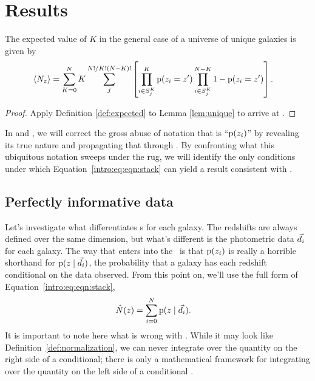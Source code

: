 \section{Results}

\begin{theorem}\label{thm:general}
	The expected value of $K$ in the general case of a universe of unique galaxies is given by
	\begin{align}
	\eqlabel{eqn:complete}
	\langle N_{z} \rangle &= \sum_{K = 0}^{N} K \sum_{j}^{N! / K! (N - K)!} \left[ \prod_{i \in S^{K}_{j}}^{K} \pr{z_{i} = z'} \prod_{i \in S^{K}_{j}}^{N - K} 1 - \pr{z_{i} = z'} \right].
	\end{align}
\end{theorem}
\begin{proof}
	Apply Definition \ref{def:expected} to Lemma \ref{lem:unique} to arrive at .
\end{proof}

In  and , we will correct the gross abuse of notation that is ``$\mathrm{p}(z_{i})$'' by revealing its true nature and propagating that through .
By confronting what this ubiquitous notation sweeps under the rug, we will identify the only conditions under which Equation~\ref{intro:eq:eqn:stack} can yield a result consistent with .

\subsection{Perfectly informative data}

Let's investigate what differentiates \pzpdf s for each galaxy.
The redshifts are always defined over the same dimension, but what's different is the photometric data $\vec{d}_{i}$ for each galaxy.
The way that enters into the \pzpdf\ is that $\mathrm{p}(z_{i})$ is really a horrible shorthand for $\mathrm{p}(z \mid \vec{d}_{i})$, the probability that a galaxy has each redshift conditional on the data observed.
From this point on, we'll use the full form of Equation~\ref{intro:eq:eqn:stack},
\begin{align}
\eqlabel{eqn:stackwithdata}
\hat{N}(z) &= \sum_{i = 0}^{N} \pr{z \gvn \data_{i}} .
\end{align}
It is important to note here what is wrong with .
While it may look like Definition~\ref{def:normalization}, we can never integrate over the quantity on the right side of a conditional; there is only a mathematical framework for integrating over the quantity on the left side of a conditional \citep{hogg_data_2012}.

